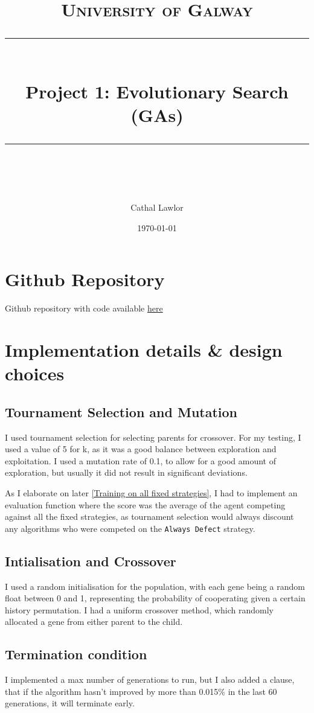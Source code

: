 \documentclass[11pt]{scrartcl} %
\title{	
	\normalfont\normalsize
	\textsc{University of Galway}\\ %
	\vspace{25pt} %
	\rule{\linewidth}{0.5pt}\\ %
	\vspace{20pt} %
	{\huge  Project 1: Evolutionary Search (GAs)}\\ %
	\vspace{12pt} %
	\rule{\linewidth}{2pt}\\ %
	\vspace{12pt} %
}
\author{\LARGE Cathal Lawlor} %
\date{\normalsize\today} %
\begin{document}
\maketitle %

\section{Github Repository}
Github repository with code available \href{https://github.com/Laan33/ai_project_2}{here}

\section{Implementation details \& design choices}

\subsection{Tournament Selection and Mutation}
I used tournament selection for selecting parents for crossover. 
For my testing, I used a value of 5 for k, as it was a good balance between exploration and exploitation.
I used a mutation rate of 0.1, to allow for a good amount of exploration, but usually it did not result in significant deviations.

As I elaborate on later \ref{Training on all fixed strategies}, I had to implement an evaluation function where the score was the average of the agent competing against all the fixed strategies, as tournament selection would always discount any algorithms who were competed on the \texttt{Always Defect} strategy.

\subsection{Intialisation and Crossover}
I used a random initialisation for the population, with each gene being a random float between 0 and 1, representing the probability of cooperating given a certain history permutation.
I had a uniform crossover method, which randomly allocated a gene from either parent to the child.

\subsection{Termination condition}
I implemented a max number of generations to run, but I also added a clause, that if the algorithm hasn't improved by more than 0.015\% in the last 60 generations, it will terminate early.
\end{document}

